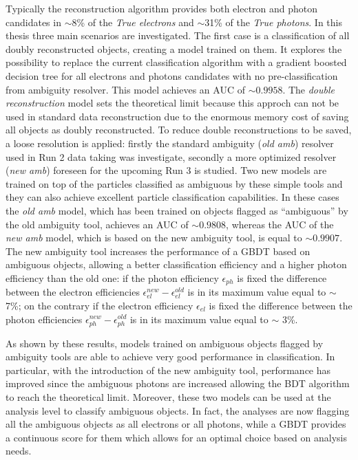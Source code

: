 \documentclass[a4paper, oneside, 11pt]{book}
\begin{document}
	Typically the reconstruction algorithm provides both electron and photon candidates in $\sim$8\% of the \textit{True electrons} and $\sim$31\% of the \textit{True photons}. In this thesis three main scenarios are investigated. The first case is a classification of all doubly reconstructed objects, creating a model trained on them. It explores the possibility to replace the current classification algorithm with a gradient boosted decision tree for all electrons and photons candidates with no pre-classification from ambiguity resolver. This model achieves an AUC of $\sim0.9958$. The \textit{double reconstruction} model sets the theoretical limit because this approch can not be used in standard data reconstruction due to the enormous memory cost of saving all objects as doubly reconstructed. To reduce double reconstructions to be saved, a loose resolution is applied: firstly the standard ambiguity (\textit{old amb}) resolver used in Run 2 data taking was investigate, secondly a more optimized resolver (\textit{new amb}) foreseen for the upcoming Run 3 is studied. Two new models are trained on top of the particles classified as ambiguous by these simple tools and they can also achieve excellent particle classification capabilities. In these cases the \textit{old amb} model, which has been trained on objects flagged as “ambiguous” by the old ambiguity tool, achieves an AUC of $\sim0.9808$, whereas the AUC of the \textit{new amb} model, which is based on the new ambiguity tool, is equal to $\sim0.9907$. The new ambiguity tool increases the performance of a GBDT based on ambiguous objects, allowing a better classification efficiency and a higher photon efficiency than the old one: if the photon efficiency $\epsilon_{ph}$ is fixed the difference between the electron efficiencies $\epsilon_{el}^{new} - \epsilon_{el}^{old}$ is in its maximum value equal to $\sim$ 7\%; on the contrary if the electron efficiency $\epsilon_{el}$ is fixed the difference between the photon efficiencies $\epsilon_{ph}^{new} - \epsilon_{ph}^{old}$ is in its maximum value equal to $\sim$ 3\%.
	
	As shown by these results, models trained on ambiguous objects flagged by ambiguity tools are able to achieve very good performance in classification. In particular, with the introduction of the new ambiguity tool, performance has improved since the ambiguous photons are increased allowing the BDT algorithm to reach the theoretical limit. Moreover, these two models can be used at the analysis level to classify ambiguous objects. In fact, the analyses are now flagging all the ambiguous objects as all electrons or all photons, while a GBDT provides a continuous score for them which allows for an optimal choice based on analysis needs.
	\fi
	\newpage
	
	
	
\end{document}
